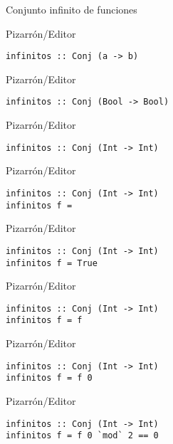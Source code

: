 \documentclass[pdf]{beamer}
\begin{document}
\begin{frame}[fragile]{Conjunto infinito de funciones}

\begin{overprint}
    
\begin{block}{Pizarrón/Editor}
\begin{verbatim}
infinitos :: Conj (a -> b)
\end{verbatim}
\end{block}

\begin{block}{Pizarrón/Editor}
\begin{verbatim}
infinitos :: Conj (Bool -> Bool)
\end{verbatim}
\end{block}

\begin{block}{Pizarrón/Editor}
\begin{verbatim}
infinitos :: Conj (Int -> Int)
\end{verbatim}
\end{block}

\begin{block}{Pizarrón/Editor}
\begin{verbatim}
infinitos :: Conj (Int -> Int)
infinitos f = 
\end{verbatim}
\end{block}

\begin{block}{Pizarrón/Editor}
\begin{verbatim}
infinitos :: Conj (Int -> Int)
infinitos f = True
\end{verbatim}
\end{block}

\begin{block}{Pizarrón/Editor}
\begin{verbatim}
infinitos :: Conj (Int -> Int)
infinitos f = f
\end{verbatim}
\end{block}

\begin{block}{Pizarrón/Editor}
\begin{verbatim}
infinitos :: Conj (Int -> Int)
infinitos f = f 0
\end{verbatim}
\end{block}

\begin{block}{Pizarrón/Editor}
\begin{verbatim}
infinitos :: Conj (Int -> Int)
infinitos f = f 0 `mod` 2 == 0
\end{verbatim}
\end{block}


\end{overprint}
\end{frame}
\end{document}
